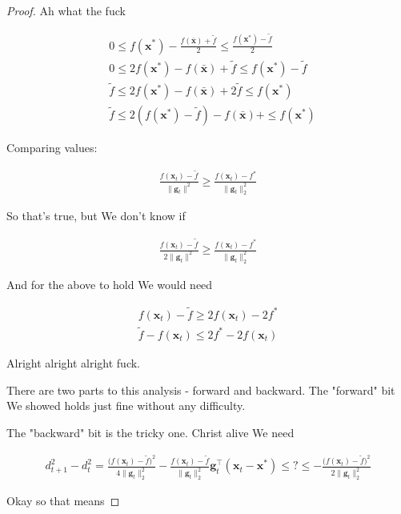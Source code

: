 \documentclass{article}
\begin{document}
\begin{proof}
	Ah what the fuck
	
	\begin{align}
		&0 \le f(\mathbf{x}^*) - \frac{f(\bar{\mathbf{x}}) + \tilde{f}}{2} \le \frac{f(\mathbf{x}^*) - \tilde{f}}{2}\\
		&0 \le2 f(\mathbf{x}^*) - f(\bar{\mathbf{x}}) + \tilde{f} \le f(\mathbf{x}^*) - \tilde{f}\\
		& \tilde{f} \le2 f(\mathbf{x}^*) - f(\bar{\mathbf{x}}) + 2\tilde{f} \le f(\mathbf{x}^*) \\
		& \tilde{f} \le 2 (f(\mathbf{x}^*) - \tilde{f}) - f(\bar{\mathbf{x}}) + \le f(\mathbf{x}^*) 
	\end{align}
	
	Comparing values:
	
	\begin{align}
		\frac{f(\mathbf{x}_t) - \tilde{f}}{\|\mathbf{g}_t\|^2}\ge \frac{f(\mathbf{x}_t) - f^*}{\|\mathbf{g}_t\|^2_2}
	\end{align}
	
	So that's true, but We don't know if 
	
	\begin{align}
		\frac{f(\mathbf{x}_t) - \tilde{f}}{2\|\mathbf{g}_t\|^2}\ge \frac{f(\mathbf{x}_t) - f^*}{\|\mathbf{g}_t\|^2_2}
	\end{align}
	
	And for the above to hold We would need
	
	\begin{align}
		f(\mathbf{x}_t) - \tilde{f}\ge 2f(\mathbf{x}_t) - 2f^*\\
		\tilde{f} - f(\mathbf{x}_t)\le  2f^* - 2f(\mathbf{x}_t) 
	\end{align}


	Alright alright alright fuck.
	
	There are two parts to this analysis - forward and backward. The "forward" bit We showed holds just fine without any difficulty. 
	
	The "backward" bit is the tricky one.  Christ alive We need
	
	\begin{align}
		d_{t+1}^2-d_t^2 = \frac{\big(f(\mathbf{x}_t)-\tilde{f} \big)^2}{4\|\mathbf{g}_t\|^2_2}   - \frac{f(\mathbf{x}_t)-\tilde{f} }{ \|\mathbf{g}_t\|^2_2} \mathbf{g}_t^\top(\mathbf{x}_t-\mathbf{x}^*) \le ? \le   -\frac{\big(f(\mathbf{x}_t)-\tilde{f}\big)^2}{2\|\mathbf{g}_t\|^2_2}
	\end{align}
	
	Okay so that means 


\end{proof}
\end{document}
